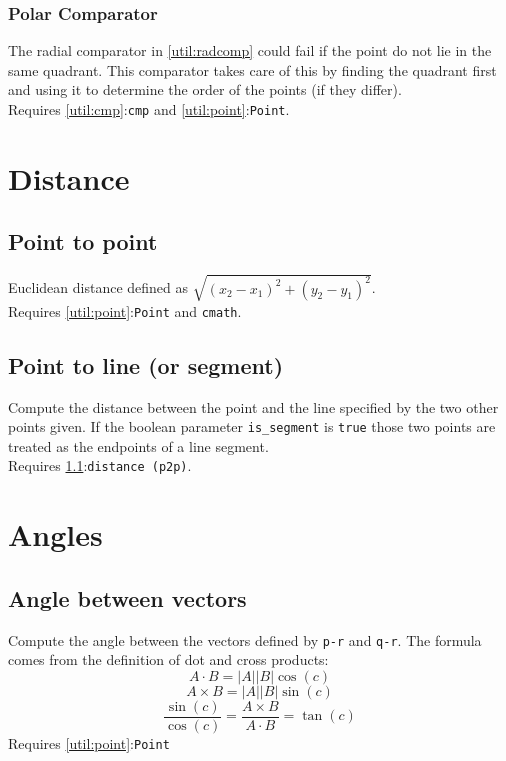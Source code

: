 \documentclass[11pt, oneside]{article}   	%
\begin{document}

\subsubsection{Polar Comparator}\label{util:polarcomp}
The radial comparator in \ref{util:radcomp} could fail if the point do not lie in the same quadrant. This comparator takes care of this by finding the quadrant first and using it to determine the order of the points (if they differ).\\
Requires \ref{util:cmp}:\verb|cmp| and \ref{util:point}:\verb|Point|.



\section{Distance}
\subsection{Point to point}\label{distance:p2p}
	Euclidean distance defined as $\sqrt{(x_2 - x_1)^2 + (y_2 - y_1) ^ 2}$.\\Requires \ref{util:point}:\verb|Point| and \verb|cmath|.
	
\subsection{Point to line (or segment)}\label{distance:p2l}
	Compute the distance between the point and the line specified by the two other points given. If the boolean parameter \verb|is_segment| is \verb|true| those two points are treated as the endpoints of a line segment.\\ Requires \ref{distance:p2p}:\verb|distance (p2p)|.

\section{Angles}


\subsection{Angle between vectors}\label{angles:angle}
	Compute the angle between the vectors defined by \verb|p-r| and \verb|q-r|. The formula comes from the definition of dot and cross products: \[ A \cdot B = |A||B|\cos(c)\]
				\[ A \times B = |A||B|\sin(c)\] 
				\[\frac{\sin(c)}{\cos(c)} = \frac{A \times B}{A \cdot B}  = \tan(c)\]	
	Requires \ref{util:point}:\verb|Point|
\end{document}

